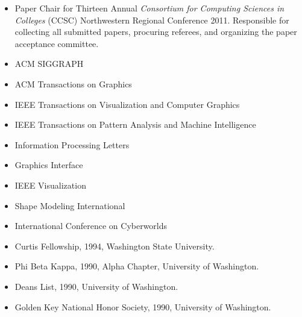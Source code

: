 \documentclass[10pt]{article}
\begin{document}



\begin{itemize}
\item Paper Chair for Thirteen Annual {\em Consortium for Computing Sciences in Colleges} (CCSC)
Northwestern Regional Conference 2011. Responsible for collecting all submitted papers, procuring referees, and organizing the paper acceptance committee.
\end{itemize}

\begin{itemize}
\item ACM SIGGRAPH
\item ACM Transactions on Graphics
\item IEEE Transactions on Visualization and Computer Graphics
\item IEEE Transactions on Pattern Analysis and Machine Intelligence
\item Information Processing Letters
\item Graphics Interface
\item IEEE Visualization
\item Shape Modeling International
\item International Conference on Cyberworlds
\end{itemize}

\vspace{0.25cm}



\begin{itemize}
\item Curtis Fellowship, 1994, Washington State University.
\item Phi Beta Kappa, 1990, Alpha Chapter, University of Washington.
\item Deans List, 1990, University of Washington.
\item Golden Key National Honor Society, 1990, University of Washington.
\end{itemize}
\end{document}
